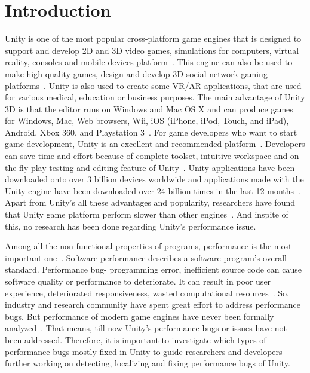 \chapter{Introduction}
\label{chapter:introduction}
Unity is one of the most popular cross-platform game engines that is designed to support and develop 2D and 3D video games, simulations for computers, virtual reality, consoles and mobile devices platform~\cite{UnityDoc}. This engine can also be used to  make high quality games, design and develop 3D social network gaming platforms~\cite{bae2014}. Unity is also used to create some VR/AR applications, that are used for various medical, education or business purposes. The main advantage of Unity 3D is that the editor runs on Windows and Mac OS X and can produce  games for Windows, Mac, Web browsers, Wii, iOS (iPhone, iPod, Touch, and iPad), Android, Xbox 360, and Playstation 3~\cite{Macedo2011}. For game developers who want to start game development, Unity is an excellent and recommended platform~\cite{Buyuksalih2017}. Developers can save time and effort because of complete toolset, intuitive workspace and on the-fly play testing and editing feature of Unity~\cite{Kim2014}. Unity applications have been downloaded onto over 3 billion devices worldwide and applications made with the Unity engine have been downloaded over 24 billion times in the last 12 months~\cite{FeaturesUnity}. Apart from Unity's all these advantages and popularity, researchers have found that Unity game platform perform slower than other engines~\cite{Buyuksalih2017}. And inspite of this, no research has been done regarding Unity's performance issue. 

Among all the non-functional properties of programs, performance is the most important one~\cite{Kim2016,Woodside2007}. Software performance describes a software program's overall standard. Performance bug- programming error, inefficient source code can cause software quality or performance to deteriorate. It can result in poor user experience, deteriorated responsiveness, wasted computational resources~\cite{molyneaux2009,bryant2003}. So, industry and research community have spent great effort to address performance bugs. But performance of modern game engines have never been formally analyzed~\cite{messaoudi2015}. That means, till now Unity's performance bugs or issues have not been addressed. Therefore, it is important to investigate which types of performance bugs mostly fixed in Unity to guide researchers and developers further working on detecting, localizing and fixing performance bugs of Unity.

